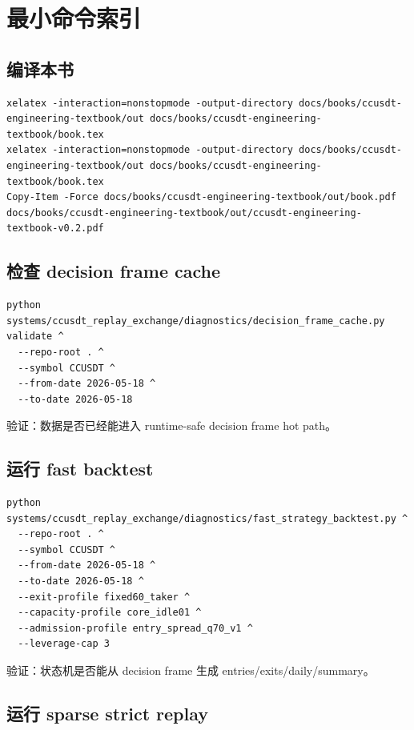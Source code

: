 \chapter{最小命令索引}

\section{编译本书}

\begin{lstlisting}
xelatex -interaction=nonstopmode -output-directory docs/books/ccusdt-engineering-textbook/out docs/books/ccusdt-engineering-textbook/book.tex
xelatex -interaction=nonstopmode -output-directory docs/books/ccusdt-engineering-textbook/out docs/books/ccusdt-engineering-textbook/book.tex
Copy-Item -Force docs/books/ccusdt-engineering-textbook/out/book.pdf docs/books/ccusdt-engineering-textbook/out/ccusdt-engineering-textbook-v0.2.pdf
\end{lstlisting}

\section{检查 decision frame cache}

\begin{lstlisting}
python systems/ccusdt_replay_exchange/diagnostics/decision_frame_cache.py validate ^
  --repo-root . ^
  --symbol CCUSDT ^
  --from-date 2026-05-18 ^
  --to-date 2026-05-18
\end{lstlisting}

验证：数据是否已经能进入 runtime-safe decision frame hot path。

\section{运行 fast backtest}

\begin{lstlisting}
python systems/ccusdt_replay_exchange/diagnostics/fast_strategy_backtest.py ^
  --repo-root . ^
  --symbol CCUSDT ^
  --from-date 2026-05-18 ^
  --to-date 2026-05-18 ^
  --exit-profile fixed60_taker ^
  --capacity-profile core_idle01 ^
  --admission-profile entry_spread_q70_v1 ^
  --leverage-cap 3
\end{lstlisting}

验证：状态机是否能从 decision frame 生成 entries/exits/daily/summary。

\section{运行 sparse strict replay}

